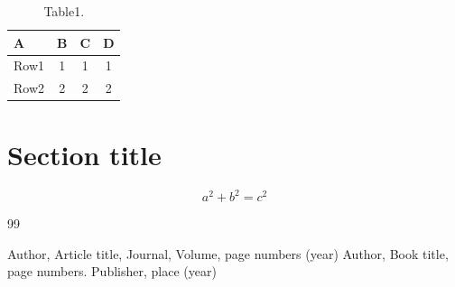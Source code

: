\documentclass[12pt]{article}
\begin{document}
\begin{table}[b]
\begin{center}
\begin{tabular}{l|ccc}
 A  &  B     &    C     &     D  \\
\hline
 Row1  &  1     &    1      &     1  \\
 Row2  &  2     &    2      &     2  \\ \hline
\end{tabular}
\caption{Table1.}
\label{tab:1}
\end{center}
\end{table}

\section{Section title}\label{sec:2}

\begin{equation}
a^2+b^2=c^2
\end{equation}



\begin{thebibliography}{99}


Author, Article title, Journal, Volume, page numbers (year)
Author, Book title, page numbers. Publisher, place (year)

\end{thebibliography}
\end{document}
